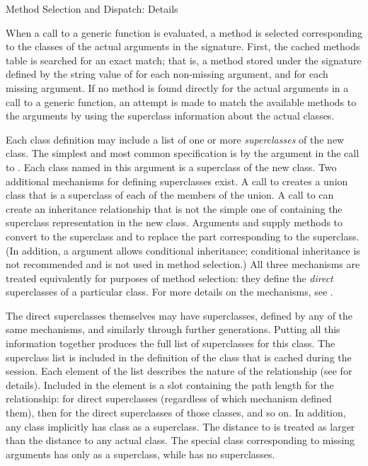 \begin{Section}{Method Selection and Dispatch: Details}

When a call to a generic function is evaluated, a method is selected corresponding
to the classes of the actual arguments in the signature.
First, the cached methods table is searched for an  exact match;
that is, a method stored under the signature defined by
the string value of  for each non-missing
argument, and  for each missing argument.
If no method is found directly for the actual arguments in a call to a
generic function, an attempt is made to match the available methods to
the arguments by using the superclass information about the actual classes.

Each class definition may include a list of  one or more
\emph{superclasses} of the new class.
The simplest and most common specification is by the  argument in
the  call to .
Each class named in this argument is a superclass of the new class.
Two additional mechanisms for defining
superclasses exist.
A call to  creates a union class that
is a
superclass of each of the members of the union.
A call to 
 can create an inheritance relationship that is not the simple one of
containing the superclass representation in the new class.
Arguments  and  supply methods to convert
to the superclass and to replace the part corresponding to the superclass.
(In addition, a  argument allows conditional inheritance;  conditional inheritance is not
recommended and is not used in method selection.)
All three mechanisms are treated equivalently for purposes of
method selection:  they define the \emph{direct} superclasses of a
particular class.
For more details on the mechanisms, see .

The direct superclasses themselves may
have superclasses, defined by any of the same mechanisms, and
similarly through further generations.  Putting all this information together produces
the full list of superclasses for this class.
The superclass list is included in the definition of the class that is
cached during the \R{} session.
Each element of the list describes the nature of the relationship (see
 for details).
Included in the element is a  slot containing
the path length for the relationship:
 for direct superclasses (regardless of which mechanism
defined them), then  for the direct superclasses of those
classes, and so on.
In addition, any class implicitly has class  as a superclass.  The
distance to  is treated as larger than the distance to any
actual class.
The special class  corresponding to missing arguments
has only  as a superclass, while  has no
superclasses.


\end{Section}

